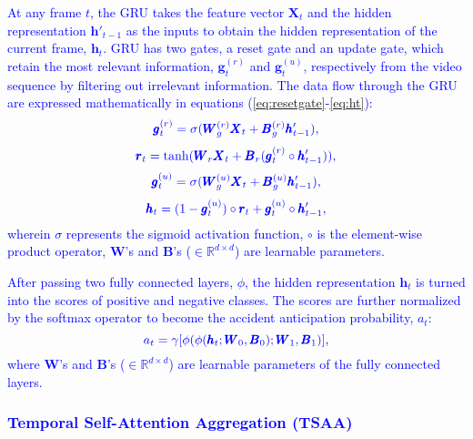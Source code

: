 \documentclass[journal]{IEEEtran}
\begin{document}
\textcolor{blue}{At any frame $t$, the GRU takes the feature vector $\pmb{X}_t$ and the hidden representation $\pmb{h}'_{t-1}$ as the inputs to obtain the hidden representation of the current frame, $\pmb{h}_t$. GRU has two gates, a reset gate and an update gate, which retain the most relevant information, $\pmb{g}_t^{(r)}$ and $\pmb{g}_t^{(u)}$, respectively from the video sequence by filtering out irrelevant information. The data flow through the GRU are expressed mathematically in equations (\ref{eq:resetgate}-\ref{eq:ht}):
}
\begin{equation}  
\textcolor{blue}{\pmb{g}_t^{(r)} = \sigma(\pmb{W}_g^{(r)}\pmb{X}_t + \pmb{B}_g^{(r)}\pmb{h}'_{t-1}),}
\label{eq:resetgate}
\end{equation} 
\vspace{-1em}
\begin{equation} 
\textcolor{blue}{\pmb{r}_t =  \tanh (\pmb{W}_r \pmb{X}_t+\pmb{B}_r(\pmb{g}_t^{(r)} \circ \pmb{h}'_{t-1}) ), }
\end{equation}
\vspace{-1em}
\begin{equation} 
\textcolor{blue}{\pmb{g}_t^{(u)} = \sigma(\pmb{W}_g^{(u)}\pmb{X}_t + \pmb{B}_g^{(u)}\pmb{h}'_{t-1}),} 
\end{equation} 
\vspace{-1em}
\begin{equation} 
    \textcolor{blue}{\pmb{h}_t = (1- \pmb{g}_t^{(u)}) \circ \pmb{r}_t  + \pmb{g}_t^{(u)} \circ \pmb{h}'_{t-1}, }
\label{eq:ht}
\end{equation}
\textcolor{blue}{wherein $\sigma$ represents the sigmoid activation function, $\circ$ is the element-wise product operator, $\pmb{W}$'s and $\pmb{B}$'s ($\in \mathbb{R}^{d\times d}$) are learnable parameters.}

\textcolor{blue}{After passing two fully connected layers, $\phi$, the hidden representation $\pmb{h}_t$ is turned into the scores of 
positive and negative classes. The scores are further normalized by the softmax operator to become the accident anticipation probability, $a_t$:}
\begin{equation} 
    \textcolor{blue}{a_t = \gamma[\phi(\phi(\pmb{h}_t;\pmb{W}_0,\pmb{B}_0);\pmb{W}_1,\pmb{B}_1)]}, 
\label{eq:at}
\end{equation}
\textcolor{blue}{where $\pmb{W}$'s and $\pmb{B}$'s ($\in \mathbb{R}^{d\times d}$) are learnable parameters of the fully connected layers.}

\subsubsection{\textcolor{blue}{Temporal Self-Attention Aggregation (TSAA)}}
\label{sub:saa}
\end{document}

